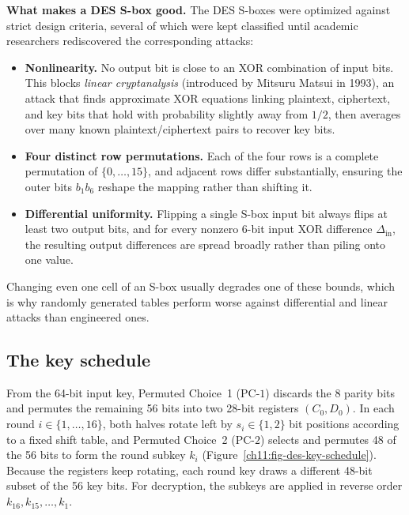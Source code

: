 \begin{whybox}
\textbf{What makes a DES S-box good.} The DES S-boxes were optimized against strict design criteria, several of which were kept classified until academic researchers rediscovered the corresponding attacks:
\begin{itemize}
  \item \textbf{Nonlinearity.} No output bit is close to an XOR combination of input bits. This blocks \emph{linear cryptanalysis} (introduced by Mitsuru Matsui in 1993), an attack that finds approximate XOR equations linking plaintext, ciphertext, and key bits that hold with probability slightly away from $1/2$, then averages over many known plaintext/ciphertext pairs to recover key bits.
  \item \textbf{Four distinct row permutations.} Each of the four rows is a complete permutation of $\{0,\dots,15\}$, and adjacent rows differ substantially, ensuring the outer bits $b_1 b_6$ reshape the mapping rather than shifting it.
  \item \textbf{Differential uniformity.} Flipping a single S-box input bit always flips at least two output bits, and for every nonzero 6-bit input XOR difference $\Delta_{\mathrm{in}}$, the resulting output differences are spread broadly rather than piling onto one value.
\end{itemize}
Changing even one cell of an S-box usually degrades one of these bounds, which is why randomly generated tables perform worse against differential and linear attacks than engineered ones.
\end{whybox}

\subsection{The key schedule}

From the 64-bit input key, Permuted Choice~1 ($\mathrm{PC}\text{-}1$) discards the 8 parity bits and permutes the remaining 56 bits into two 28-bit registers $(C_0, D_0)$. In each round $i \in \{1,\dots,16\}$, both halves rotate left by $s_i \in \{1,2\}$ bit positions according to a fixed shift table, and Permuted Choice~2 ($\mathrm{PC}\text{-}2$) selects and permutes 48 of the 56 bits to form the round subkey $k_i$ (Figure~\ref{ch11:fig-des-key-schedule}). Because the registers keep rotating, each round key draws a different 48-bit subset of the 56 key bits. For decryption, the subkeys are applied in reverse order $k_{16}, k_{15}, \dots, k_1$.

